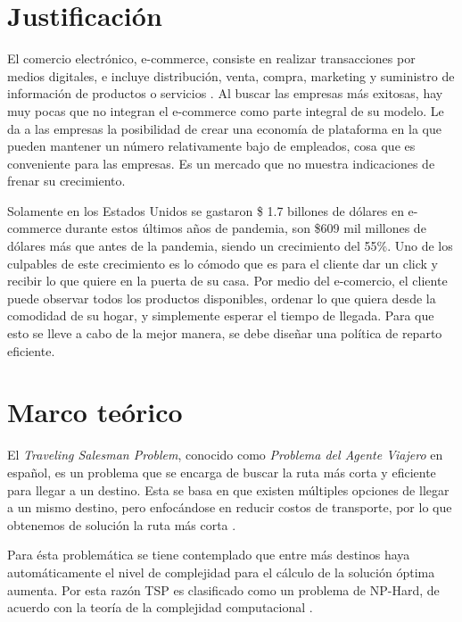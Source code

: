 \documentclass[journal]{IEEEtran}
\begin{document}
    \section{Justificación} \label{sec:justification}

        El comercio electrónico, e-commerce, consiste en realizar transacciones por medios digitales, e incluye distribución, venta, compra, marketing y suministro de información de productos o servicios \cite{visand}. Al buscar las empresas más exitosas, hay muy pocas que no integran el e-commerce como parte integral de su modelo. Le da a las empresas la posibilidad de crear una economía de plataforma \cite{dekker-supremacy} en la que pueden mantener un número relativamente bajo de empleados, cosa que es conveniente para las empresas. Es un mercado que no muestra indicaciones de frenar su crecimiento. 
        
        Solamente en los Estados Unidos se gastaron \$ 1.7 billones de dólares en e-commerce durante estos últimos años de pandemia, son \$609 mil millones de dólares más que antes de la pandemia, siendo un crecimiento del 55\%. Uno de los culpables de este crecimiento es lo cómodo que es para el cliente dar un click y recibir lo que quiere en la puerta de su casa. Por medio del e-comercio, el cliente puede observar todos los productos disponibles, ordenar lo que quiera desde la comodidad de su hogar, y simplemente esperar el tiempo de llegada. Para que esto se lleve a cabo de la mejor manera, se debe diseñar una política de reparto eficiente.

    \section{Marco teórico} \label{sec:theoretical}
    
        El \emph{Traveling Salesman Problem}, conocido como \emph{Problema del Agente Viajero} en español, es un problema que se encarga de buscar la ruta más corta y eficiente para llegar a un destino. Esta se basa en que existen múltiples opciones de llegar a un mismo destino, pero enfocándose en reducir costos de transporte, por lo que obtenemos de solución la ruta más corta \cite{trevelingProb}.

        Para ésta problemática se tiene contemplado que entre más destinos haya automáticamente el nivel de complejidad para el cálculo de la solución óptima aumenta. Por esta razón TSP es clasificado como un problema de NP-Hard, de acuerdo con la teoría de la complejidad computacional \cite{trevelingProb}.
\end{document}
